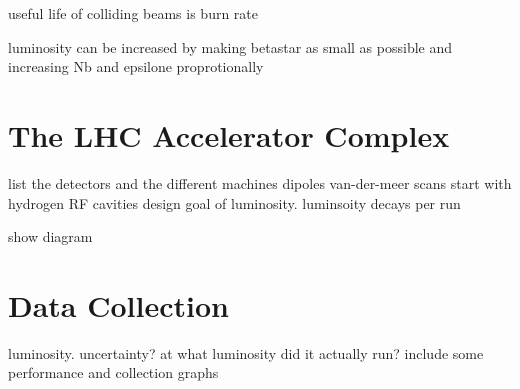 useful life of colliding beams is burn rate

luminosity can be increased by making betastar as small as possible
and increasing Nb and epsilone proprotionally



\section{The LHC Accelerator Complex}
list the detectors and the different machines
dipoles
van-der-meer scans
start with hydrogen
RF cavities
design goal of luminosity. luminsoity decays per run


show diagram
\section{Data Collection}

luminosity. uncertainty?
at what luminosity did it actually run?
include some performance and collection graphs
